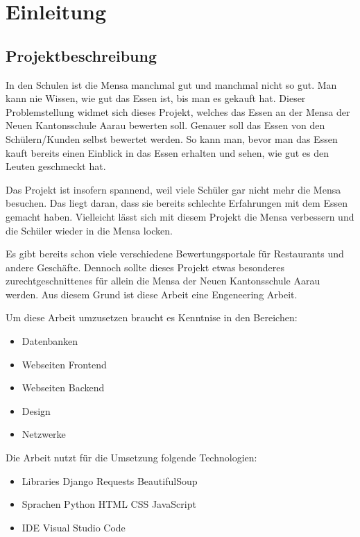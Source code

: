 \chapter{Einleitung}\label{chap:einleit}
\section{Projektbeschreibung}\label{sec:projektbeschreibung}

In den Schulen ist die Mensa manchmal gut und manchmal nicht so gut. Man kann
nie Wissen, wie gut das Essen ist, bis man es gekauft hat. Dieser
Problemstellung widmet sich dieses Projekt, welches das Essen an der Mensa der
Neuen Kantonsschule Aarau bewerten soll. Genauer soll das Essen von den
Schülern/Kunden selbst bewertet werden. So kann man, bevor man das Essen kauft
bereits einen Einblick in das Essen erhalten und sehen, wie gut es den Leuten
geschmeckt hat.

Das Projekt ist insofern spannend, weil viele Schüler gar nicht mehr die Mensa
besuchen. Das liegt daran, dass sie bereits schlechte Erfahrungen mit dem Essen
gemacht haben. Vielleicht lässt sich mit diesem Projekt die Mensa verbessern und
die Schüler wieder in die Mensa locken.

Es gibt bereits schon viele verschiedene Bewertungsportale für Restaurants und
andere Geschäfte. Dennoch sollte dieses Projekt etwas besonderes
zurechtgeschnittenes für allein die Mensa der Neuen Kantonsschule Aarau werden.
Aus diesem Grund ist diese Arbeit eine Engeneering Arbeit.

Um diese Arbeit umzusetzen braucht es Kenntnise in den Bereichen:
\begin{itemize}
    \item Datenbanken
    \item Webseiten Frontend
    \item Webseiten Backend
    \item Design
    \item Netzwerke
\end{itemize}

Die Arbeit nutzt für die Umsetzung folgende Technologien:
\begin{itemize}
    \item Libraries
    \subitem Django
    \subitem Requests
    \subitem BeautifulSoup
    \item Sprachen
    \subitem Python
    \subitem HTML
    \subitem CSS
    \subitem JavaScript
    \item IDE
    \subitem Visual Studio Code
\end{itemize}

